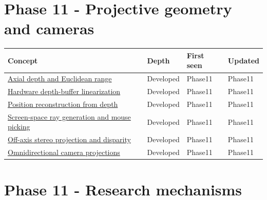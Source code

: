 \section{Phase 11 - Projective geometry and cameras}\label{appendix-a6d556a4ef50-phase-11---projective-geometry-and-cameras}

{\def\LTcaptype{none} %
\begin{longtable}[]{@{}
  >{\raggedright\arraybackslash}p{}
  >{\raggedright\arraybackslash}p{}
  >{\raggedright\arraybackslash}p{}
  >{\raggedright\arraybackslash}p{}@{}}
\toprule\noalign{}
\begin{minipage}[b]{\linewidth}\raggedright
Concept
\end{minipage} & \begin{minipage}[b]{\linewidth}\raggedright
Depth
\end{minipage} & \begin{minipage}[b]{\linewidth}\raggedright
First seen
\end{minipage} & \begin{minipage}[b]{\linewidth}\raggedright
Updated
\end{minipage} \\
\midrule\noalign{}
\endhead
\bottomrule\noalign{}
\endlastfoot
\hyperref[appendix-cac01ebeeb11]{Axial depth and Euclidean range} & Developed & Phase11 & Phase11 \\
\hyperref[appendix-1bc40b08db4a]{Hardware depth-buffer linearization} & Developed & Phase11 & Phase11 \\
\hyperref[appendix-2cbf2968e866]{Position reconstruction from depth} & Developed & Phase11 & Phase11 \\
\hyperref[appendix-f1a6d43e80d1]{Screen-space ray generation and mouse picking} & Developed & Phase11 & Phase11 \\
\hyperref[appendix-0976e86e5b9f]{Off-axis stereo projection and disparity} & Developed & Phase11 & Phase11 \\
\hyperref[appendix-fc99ad39f351]{Omnidirectional camera projections} & Developed & Phase11 & Phase11 \\
\end{longtable}
}

\section{Phase 11 - Research mechanisms}\label{appendix-a6d556a4ef50-phase-11---research-mechanisms}

